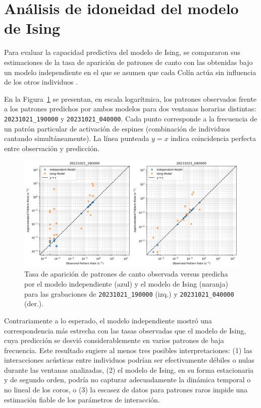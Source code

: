 \section{Análisis de idoneidad del modelo de Ising}
\label{sec:res_idoneidad}


Para evaluar la capacidad predictiva del modelo de Ising, se 
compararon sus estimaciones de la tasa de aparición de patrones 
de canto con las obtenidas bajo un modelo independiente en el 
que se asumen que cada Colín actúa sin influencia de los otros individuos 
\cite{schneidman2006weak}.

En la Figura~\ref{fig:ising_vs_indep} se presentan, en escala logarítmica, 
los patrones observados frente a los patrones predichos por 
ambos modelos para dos ventanas horarias distintas: \texttt{20231021\_190000}
y \texttt{20231021\_040000}. Cada punto corresponde a la frecuencia de un patrón 
particular de activación de espines (combinación de individuos 
cantando simultáneamente). La línea punteada \(y=x\) indica 
coincidencia perfecta entre observación y predicción.

\begin{figure}[ht]
    \centering
    \includegraphics[width=\columnwidth]{Graphics/isingvsindependent.png}
    \caption{Tasa de aparición de patrones de canto observada versus predicha por el modelo independiente (azul) y el modelo de Ising (naranja) para las grabaciones de \texttt{20231021\_190000} (izq.) y \texttt{20231021\_040000} (der.).}
    \label{fig:ising_vs_indep}
\end{figure}

Contrariamente a lo esperado, el modelo independiente mostró una 
correspondencia más estrecha con las tasas observadas que el 
modelo de Ising, cuya predicción se desvió considerablemente en 
varios patrones de baja frecuencia. Este resultado sugiere al 
menos tres posibles interpretaciones: (1) las interacciones 
acústicas entre individuos podrían ser efectivamente débiles o 
nulas durante las ventanas analizadas, (2) el modelo de Ising, 
en su forma estacionaria y de segundo orden, podría no capturar 
adecuadamente la dinámica temporal o no lineal de los coros, o 
(3) la escasez de datos para patrones raros impide una estimación 
fiable de los parámetros de interacción.

